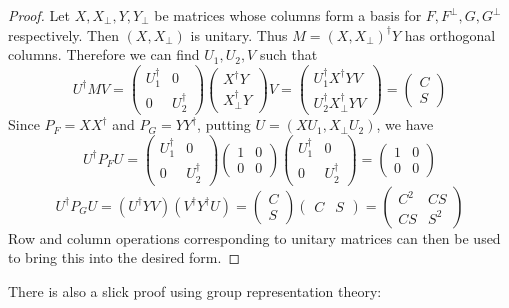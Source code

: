 \documentclass[11pt]{article}
\begin{document}
\begin{proof}
    Let $X,X_\perp, Y, Y_{\perp}$ be matrices whose columns form a basis for $F,F^\perp, G, G^\perp$ respectively.  Then $(X, X_\perp)$ is unitary. Thus $M = (X, X_\perp)^\dagger Y$ has orthogonal columns. Therefore we can find $U_1, U_2, V$ such that
$$
U^\dagger M V = \begin{pmatrix}U_1^\dagger & 0 \\ 0 & U_2^\dagger\end{pmatrix}\begin{pmatrix}X^\dagger Y \\ X_\perp^\dagger Y\end{pmatrix}V = \begin{pmatrix}U_1^\dagger X^\dagger YV \\ U_2^\dagger X_\perp^\dagger YV\end{pmatrix} = \begin{pmatrix}C \\ S\end{pmatrix}
$$
Since $P_F = XX^\dagger$ and $P_G = YY^\dagger$, putting $U = (XU_1, X_{\perp} U_2)$, we have 
$$
U^\dagger P_F U = \begin{pmatrix}U_1^\dagger & 0 \\ 0 & U_2^\dagger\end{pmatrix}\begin{pmatrix}1 & 0 \\ 0 & 0\end{pmatrix} \begin{pmatrix}U_1^\dagger & 0 \\ 0 & U_2^\dagger\end{pmatrix} = \begin{pmatrix}1 & 0 \\ 0 & 0\end{pmatrix}
$$
$$
U^\dagger P_G U = (U^\dagger Y V)(V^\dagger Y^\dagger U) = \begin{pmatrix}C \\ S\end{pmatrix} \begin{pmatrix}C & S\end{pmatrix} = \begin{pmatrix}C^2 & CS \\ CS & S^2\end{pmatrix}
$$
Row and column operations corresponding to unitary matrices can then be used to bring this into the desired form.
\end{proof}
There is also a slick proof using group representation theory:
\end{document}
